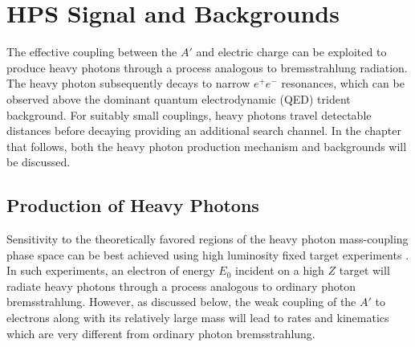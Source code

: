 
\chapter{HPS Signal and Backgrounds}

The effective coupling between the $A'$ and electric charge can be exploited to
produce heavy photons through a process analogous to bremsstrahlung radiation.
The heavy photon subsequently decays to narrow $e^+e^-$ resonances, 
which can be observed above the dominant quantum electrodynamic (QED) trident
background.  For suitably small couplings, heavy photons travel detectable 
distances before decaying providing an additional search channel. In the chapter
that follows, both the heavy photon production mechanism and 
backgrounds will be discussed.

\section{Production of Heavy Photons}

Sensitivity to the theoretically favored regions of the heavy photon 
mass-coupling phase space can be best achieved using high luminosity fixed
target experiments \cite{Bjorken:2009mm}.  In such experiments, an electron
of energy $E_{0}$ incident on a high $Z$ target will radiate heavy photons 
through a process analogous to ordinary photon bremsstrahlung. However, as 
discussed below, the weak coupling of the $A'$ to electrons along with its 
relatively large mass will lead to rates and kinematics which are very different
from ordinary photon bremsstrahlung.

